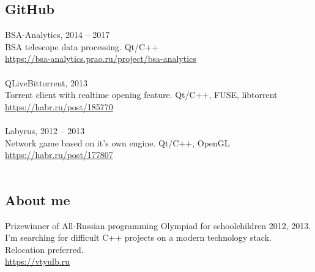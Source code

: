 \documentclass[a4paper, 11pt]{article}
\begin{document}
{    \subsection*{GitHub} {    
        BSA-Analytics, 2014 -- 2017 \\
        BSA telescope data processing. Qt/C++ \\
        \href{https://bsa-analytics.prao.ru/project/bsa-analytics}{https://bsa-analytics.prao.ru/project/bsa-analytics} \\ \\
        QLiveBittorrent, 2013 \\
        Torrent client with realtime opening feature. Qt/C++, FUSE, libtorrent \\
        \href{https://habr.ru/post/185770}{https://habr.ru/post/185770}\\ \\
        Labyrus, 2012 -- 2013 \\
        Network game based on it's own engine. Qt/C++, OpenGL \\
        \href{https://habr.ru/post/177807}{https://habr.ru/post/177807}\\ \\
    }
    
    \subsection*{About me} {
        Prizewinner of All-Russian programming Olympiad for schoolchildren 2012, 2013. \\
        I'm searching for difficult C++ projects on a modern technology stack. Relocation preferred. \\
        \href{https://vtyulb.ru}{https://vtyulb.ru}
    }
}
\end{document}
